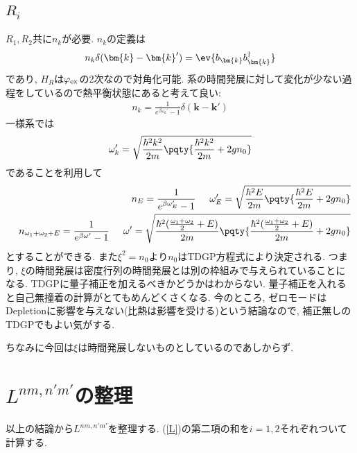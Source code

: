 \documentclass[10.5pt,a4paper]{jreport}
\begin{document}
\subsection{$R_i$}
$R_1, R_2$共に$n_k$が必要. $n_k$の定義は
\begin{eqnarray}
  n_k\delta(\bm{k} - \bm{k}') = \ev{b_{\bm{k}}b_{\bm{k}}^\dagger}
\end{eqnarray}
であり, $H_R$は$\varphi_{\rm ex}$の2次なので対角化可能. 系の時間発展に対して変化が少ない過程をしているので熱平衡状態にあると考えて良い:
\begin{eqnarray}
  n_k = \frac{1}{e^{\beta\omega_k'}-1}\delta(\bm{k} - \bm{k}')
\end{eqnarray}
一様系では
\begin{eqnarray}
  \omega_k' = \sqrt{\frac{\hbar^2k^2}{2m}\pqty{\frac{\hbar^2k^2}{2m} + 2gn_0}}
\end{eqnarray}
であることを利用して
\begin{eqnarray}
  && n_E = \frac{1}{e^{\beta\omega_E'}-1}\hspace{0.5cm}\omega_E' = \sqrt{\frac{\hbar^2E}{2m}\pqty{\frac{\hbar^2E}{2m} + 2gn_0}}\\
  &&n_{\omega_1 + \omega_2 + E} = \frac{1}{e^{\beta\omega'}-1}\hspace{0.5cm}\omega' = \sqrt{\frac{\hbar^2(\frac{\omega_1 + \omega_2}{2}+E)}{2m}\pqty{\frac{\hbar^2(\frac{\omega_1 + \omega_2}{2}+E)}{2m} + 2gn_0}}
\end{eqnarray}
とすることができる. また$\xi^2 = n_0$より$n_0$はTDGP方程式により決定される. つまり, $\xi$の時間発展は密度行列の時間発展とは別の枠組みで与えられていることになる. TDGPに量子補正を加えるべきかどうかはわからない. 量子補正を入れると自己無撞着の計算がとてもめんどくさくなる. 今のところ, ゼロモードはDepletionに影響を与えない(比熱は影響を受ける)という結論なので, 補正無しのTDGPでもよい気がする.

ちなみに今回は$\xi$は時間発展しないものとしているのであしからず. 
\section{$L^{nm,n'm'}$の整理}
以上の結論から$L^{nm,n'm'}$を整理する. (\ref{L})の第二項の和を$i = 1, 2$それぞれついて計算する.
\end{document}
